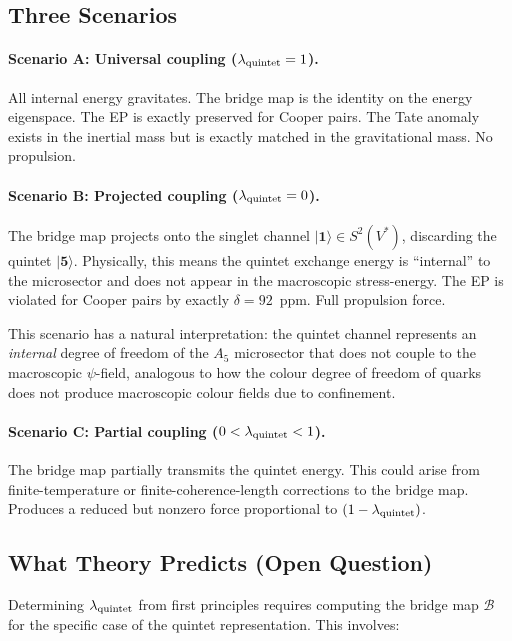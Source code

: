 \documentclass[12pt,a4paper]{article}
\theoremstyle{definition}
\theoremstyle{remark}
\begin{document}
\subsection{Three Scenarios}

\paragraph{Scenario A: Universal coupling ($\lambda_{\rm quintet} = 1$).}
All internal energy gravitates.  The bridge map is the identity on the
energy eigenspace.  The EP is exactly preserved for Cooper pairs.  The Tate
anomaly exists in the inertial mass but is exactly matched in the gravitational
mass.  No propulsion.

\paragraph{Scenario B: Projected coupling ($\lambda_{\rm quintet} = 0$).}
The bridge map projects onto the singlet channel $|\mathbf{1}\rangle \in S^2(V^*)$,
discarding the quintet $|\mathbf{5}\rangle$.  Physically, this means the
quintet exchange energy is ``internal'' to the microsector and does not appear
in the macroscopic stress-energy.  The EP is violated for Cooper pairs by
exactly $\delta = 92$~ppm.  Full propulsion force.

This scenario has a natural interpretation: the quintet channel represents an
\emph{internal} degree of freedom of the $A_5$ microsector that does not couple
to the macroscopic $\psi$-field, analogous to how the colour degree of freedom
of quarks does not produce macroscopic colour fields due to confinement.

\paragraph{Scenario C: Partial coupling ($0 < \lambda_{\rm quintet} < 1$).}
The bridge map partially transmits the quintet energy.  This could arise from
finite-temperature or finite-coherence-length corrections to the bridge map.
Produces a reduced but nonzero force proportional to $(1 - \lambda_{\rm quintet})$.

\subsection{What Theory Predicts (Open Question)}

Determining $\lambda_{\rm quintet}$ from first principles requires computing the
bridge map $\mathcal{B}$ for the specific case of the quintet representation.
This involves:
\end{document}
